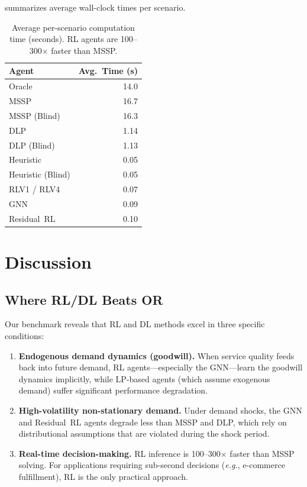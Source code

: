 \documentclass[preprint,12pt]{elsarticle}
\newcommand{\eg}{\textit{e.g.}}
\begin{document}
 summarizes average wall-clock times per scenario.

\begin{table}[htbp]
\centering
\caption{Average per-scenario computation time (seconds). RL agents
         are 100--300$\times$ faster than MSSP.}
\label{tab:timing}
\begin{tabular}{lr}
\toprule
\textbf{Agent} & \textbf{Avg.\ Time (s)} \\
\midrule
Oracle           & 14.0 \\
MSSP             & 16.7 \\
MSSP (Blind)     & 16.3 \\
DLP              & 1.14 \\
DLP (Blind)      & 1.13 \\
Heuristic        & 0.05 \\
Heuristic (Blind)& 0.05 \\
\midrule
RLV1 / RLV4      & 0.07 \\
GNN              & 0.09 \\
Residual~RL      & 0.10 \\
\bottomrule
\end{tabular}
\end{table}


\section{Discussion}\label{sec:discussion}

\subsection{Where RL/DL Beats OR}

Our benchmark reveals that RL and DL methods excel in three specific
conditions:

\begin{enumerate}
  \item \textbf{Endogenous demand dynamics (goodwill).} When service quality
        feeds back into future demand, RL agents---especially the
        GNN---learn the goodwill dynamics implicitly, while LP-based
        agents (which assume exogenous demand) suffer significant
        performance degradation.

  \item \textbf{High-volatility non-stationary demand.} Under demand shocks,
        the GNN and Residual~RL agents degrade less than MSSP and DLP,
        which rely on distributional assumptions that are violated during
        the shock period.

  \item \textbf{Real-time decision-making.} RL inference is
        100--300$\times$ faster than MSSP solving. For applications
        requiring sub-second decisions (\eg, e-commerce fulfillment),
        RL is the only practical approach.
\end{enumerate}
\end{document}
